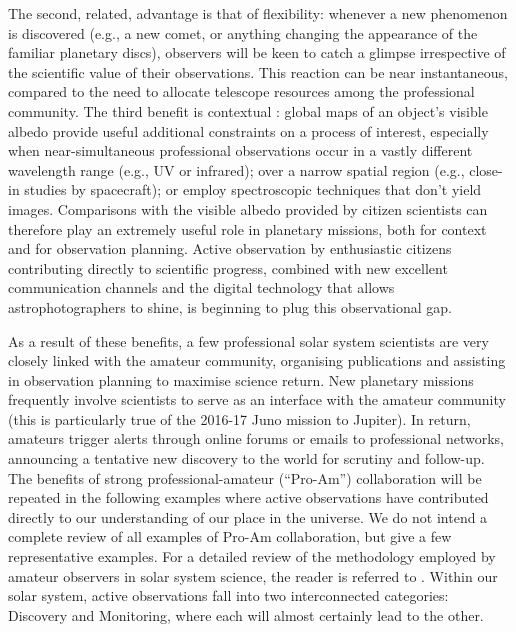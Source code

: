 \documentclass{ar2e}
\begin{document}
The second, related, advantage is that of flexibility: whenever a new phenomenon
is discovered (e.g., a new comet, or anything changing the appearance of the
familiar planetary discs), observers will be keen to catch a glimpse
irrespective of the scientific value of their observations.  This reaction can
be near instantaneous, compared to the need to allocate telescope resources
among the professional community.  The third benefit is contextual : global maps
of an object's visible albedo provide useful additional constraints on a process
of interest, especially when near-simultaneous professional observations occur
in a vastly different wavelength range (e.g., UV or infrared); over a narrow
spatial region (e.g., close-in studies by spacecraft); or employ spectroscopic
techniques that don't yield images.  Comparisons with the visible albedo
provided by citizen scientists can therefore play an extremely useful role in
planetary missions, both for context and for observation planning.  Active
observation by enthusiastic citizens contributing directly to scientific
progress, combined with new excellent communication channels  and the digital
technology that allows astrophotographers to shine, is beginning to plug this
observational gap.

As a result of these benefits, a few professional solar system scientists are
very closely linked with the amateur community, organising publications and
assisting in observation planning to maximise science return.  New planetary
missions frequently involve scientists to serve as an interface with the amateur
community (this is particularly true of the 2016-17 Juno mission to Jupiter). 
In return, amateurs trigger alerts through online forums or emails to
professional networks, announcing a tentative new discovery to the world for
scrutiny and follow-up. The benefits of strong professional-amateur (``Pro-Am'')
collaboration will be repeated in the following examples where active
observations have contributed directly to our understanding of our place in the
universe.  We do not intend a complete review of all examples of Pro-Am
collaboration, but give a few representative examples.  For a detailed review of
the methodology employed by amateur observers in solar system science, the
reader is referred to \citet{13mousis}.  Within our solar system, active
observations fall into two interconnected categories:  Discovery and Monitoring,
where each will almost certainly lead to the other.

\end{document}
